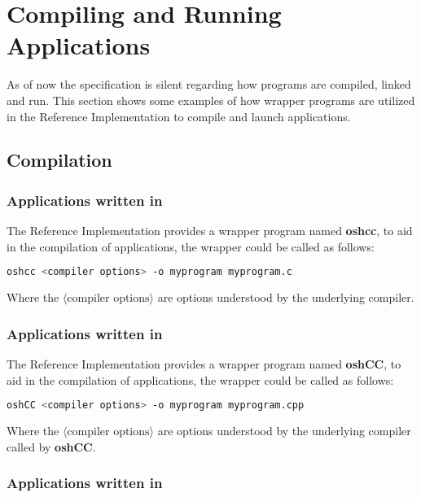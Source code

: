 \section{Compiling and Running Applications}

As of now the \openshmem{} specification is silent regarding how \openshmem{} programs
are compiled, linked and run. This section shows some examples of
how wrapper programs are utilized in the \openshmem{} Reference Implementation to compile and launch applications.
\subsection{Compilation}
\subsubsection*{Applications written in \Clang}

The  \openshmem{} Reference Implementation provides a wrapper program named \textbf{oshcc}, to aid in the compilation of \Clang{} applications, the wrapper
could be called as follows:

\begin{lstlisting}[language=bash]
oshcc <compiler options> -o myprogram myprogram.c
\end{lstlisting}
Where the $\langle\mbox{compiler options}\rangle$ are options understood by the underlying \Clang{} compiler.


\subsubsection*{Applications written in \Cpp}

The  \openshmem{} Reference Implementation provides a wrapper program named \textbf{oshCC}, to aid in the compilation of \Cpp{} applications, the
wrapper could be called as follows:

\begin{lstlisting}[language=bash]
oshCC <compiler options> -o myprogram myprogram.cpp
\end{lstlisting}
Where the $\langle\mbox{compiler options}\rangle$ are options understood by the underlying \Cpp{} compiler called by \textbf{oshCC}.


\subsubsection*{Applications written in \Fortran}

